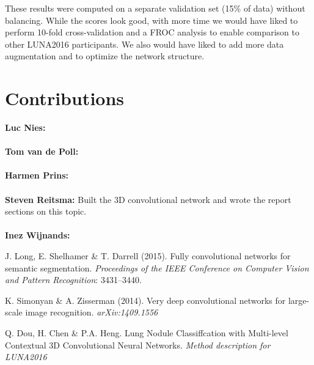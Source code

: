 \documentclass{article}
\begin{document}
These results were computed on a separate validation set (15\% of data) without balancing.
While the scores look good, with more time we would have liked to perform 10-fold cross-validation and a FROC analysis to enable comparison to other LUNA2016 participants.
We also would have liked to add more data augmentation and to optimize the network structure.

\appendix
\section{Contributions}
\textbf{Luc Nies:} \\
\\
\textbf{Tom van de Poll:} \\
\\
\textbf{Harmen Prins:} \\
\\
\textbf{Steven Reitsma:} Built the 3D convolutional network and wrote the report sections on this topic.\\
\\
\textbf{Inez Wijnands:} 



\begin{thebibliography}{}
J. Long, E. Shelhamer \& T. Darrell (2015). Fully convolutional networks for semantic segmentation. \emph{Proceedings of the IEEE Conference on Computer Vision and Pattern Recognition}: 3431--3440.

K. Simonyan \& A. Zisserman (2014). Very deep convolutional networks for large-scale image recognition. \emph{arXiv:1409.1556}

Q. Dou, H. Chen \& P.A. Heng. Lung Nodule Classiffcation with Multi-level Contextual 3D Convolutional Neural Networks. \emph{Method description for LUNA2016}


\end{thebibliography}
\end{document}
